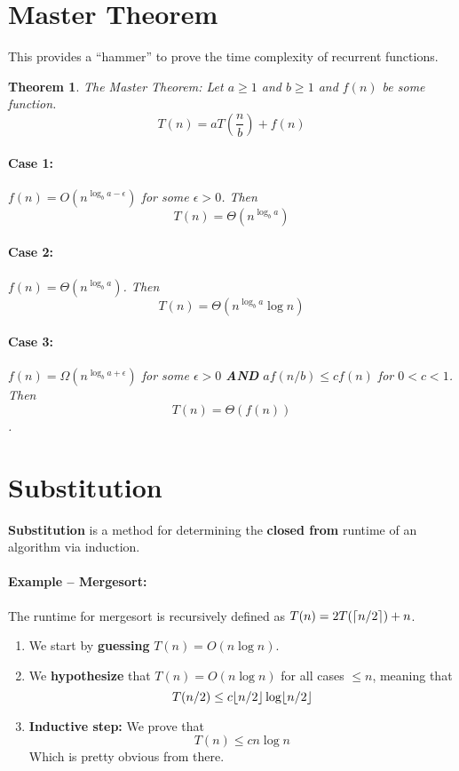 \documentclass[a4paper,12pt]{report}
\newtheorem{theorem}{Theorem}
\DeclarePairedDelimiter{\ceil}{\lceil}{\rceil}
\DeclarePairedDelimiter{\floor}{\lfloor}{\rfloor}
\begin{document}
\section{Master Theorem}

This provides a ``hammer'' to prove the time complexity of recurrent functions.
\begin{theorem}{The Master Theorem:}
Let $a \geq 1$ and $b \geq 1$ and $f(n)$ be some function.
\begin{equation}
T(n) = aT(\frac{n}{b}) + f(n)
\end{equation}

\paragraph{Case 1: } $f(n) = O(n^{\log_b a - \epsilon})$ for some $\epsilon > 0$. Then $$T(n) = \Theta(n^{\log_b a})$$

\paragraph{Case 2: } $f(n) = \Theta(n^{\log_b a})$. Then $$T(n) = \Theta(n^{\log_b a} \log n)$$

\paragraph{Case 3: } $f(n) = \Omega(n^{\log_b a + \epsilon})$ for some $\epsilon > 0$ \textbf{AND} $af(n/b) \leq c f(n)$ for $0 < c < 1$. Then $$T(n) = \Theta(f(n))$$.
\end{theorem}


\section{Substitution}

\textbf{Substitution} is a method for determining the \textbf{closed from} runtime of an algorithm via induction.

\paragraph{Example -- Mergesort: } The runtime for mergesort is recursively defined as $T(n) = 2T(\ceil{n/2}) + n$.
\begin{enumerate}
\item We start by \textbf{guessing} $T(n) = O(n\log n)$. 
\item We \textbf{hypothesize} that $T(n) = O(n\log n)$ for all cases $\leq n$, meaning that
$$T(n/2) \leq c \floor{n/2}\log \floor{n/2}$$
\item \textbf{Inductive step:} We prove that $$T(n) \leq cn\log n$$ Which is pretty obvious from there. 
\end{enumerate}
\end{document}
